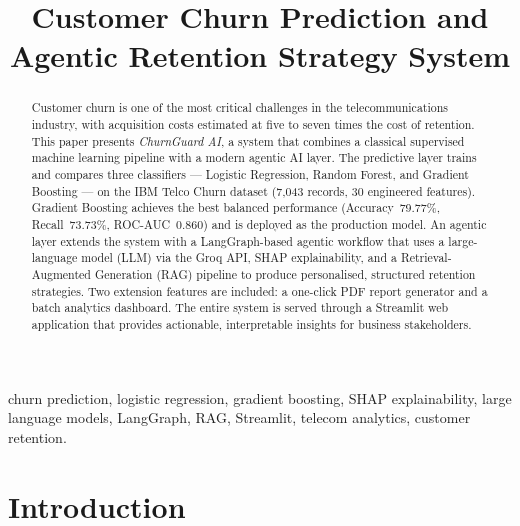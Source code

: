 \documentclass[conference]{IEEEtran}
\begin{document}
\title{Customer Churn Prediction and \\ Agentic Retention Strategy System}

\author{
}

\maketitle

\begin{abstract}
Customer churn is one of the most critical challenges in the
telecommunications industry, with acquisition costs estimated at five to
seven times the cost of retention. This paper presents
\textit{ChurnGuard AI}, a system that combines a classical
supervised machine learning pipeline with a modern agentic AI layer.
The predictive layer trains and compares three classifiers — Logistic Regression,
Random Forest, and Gradient Boosting — on the IBM Telco Churn dataset
(7,043 records, 30 engineered features). Gradient Boosting achieves the
best balanced performance (Accuracy~79.77\%, Recall~73.73\%,
ROC-AUC~0.860) and is deployed as the production model.
An agentic layer extends the system with a LangGraph-based agentic workflow
that uses a large-language model (LLM) via the Groq API, SHAP
explainability, and a Retrieval-Augmented Generation (RAG) pipeline to
produce personalised, structured retention strategies. Two extension
features are included: a one-click PDF report generator and a batch
analytics dashboard. The entire system is served through a Streamlit web
application that provides actionable, interpretable insights for business
stakeholders.
\end{abstract}

\begin{IEEEkeywords}
churn prediction, logistic regression, gradient boosting, SHAP
explainability, large language models, LangGraph, RAG, Streamlit,
telecom analytics, customer retention.
\end{IEEEkeywords}

\section{Introduction}
\end{document}
